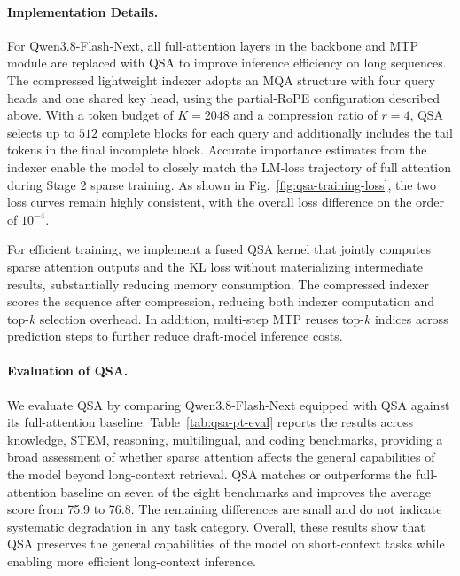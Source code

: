 \paragraph{Implementation Details.}
For Qwen3.8-Flash-Next, all full-attention layers in the backbone and MTP module are replaced with QSA to improve inference efficiency on long sequences.
The compressed lightweight indexer adopts an MQA structure with four query heads and one shared key head, using the partial-RoPE configuration described above.
With a token budget of $K=2048$ and a compression ratio of $r=4$,
QSA selects up to $512$ complete blocks for each query
and additionally includes the tail tokens in the final incomplete block.
Accurate importance estimates from the indexer enable the model to closely match the LM-loss trajectory of full attention during Stage 2 sparse training.
As shown in Fig.~\ref{fig:qsa-training-loss}, the two loss curves remain highly consistent,
with the overall loss difference on the order of $10^{-4}$.

For efficient training, we implement a fused QSA kernel that jointly computes sparse attention outputs and the KL loss without materializing intermediate results,
substantially reducing memory consumption.
The compressed indexer scores the sequence after compression, reducing both indexer computation and top-$k$ selection overhead. 
In addition, multi-step MTP reuses top-$k$ indices across prediction steps to further reduce draft-model inference costs.

\paragraph{Evaluation of QSA.}
We evaluate QSA by comparing Qwen3.8-Flash-Next equipped with QSA against its full-attention baseline. Table~\ref{tab:qsa-pt-eval} reports the results across knowledge, STEM, reasoning, multilingual, and coding benchmarks,
providing a broad assessment of whether sparse attention affects the general capabilities of the model beyond long-context retrieval.
QSA matches or outperforms the full-attention baseline on seven of the eight benchmarks and improves the average score from 75.9 to 76.8.
The remaining differences are small and do not indicate systematic degradation in any task category.
Overall, these results show that QSA preserves the general capabilities of the
model on short-context tasks while enabling more efficient long-context inference.


